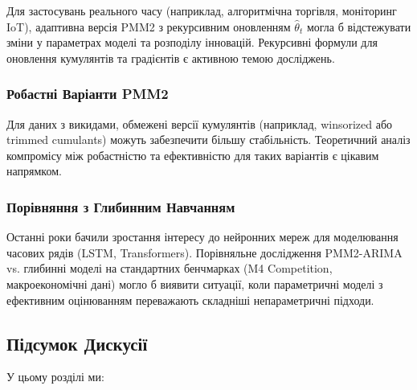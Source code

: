 \documentclass[12pt,a4paper]{article}
\begin{document}
Для застосувань реального часу (наприклад, алгоритмічна торгівля, моніторинг IoT), адаптивна версія PMM2 з рекурсивним оновленням $\hat{\theta}_t$ могла б відстежувати зміни у параметрах моделі та розподілу інновацій. Рекурсивні формули для оновлення кумулянтів та градієнтів є активною темою досліджень.

\subsubsection{Робастні Варіанти PMM2}

Для даних з викидами, обмежені версії кумулянтів (наприклад, winsorized або trimmed cumulants) можуть забезпечити більшу стабільність. Теоретичний аналіз компромісу між робастністю та ефективністю для таких варіантів є цікавим напрямком.

\subsubsection{Порівняння з Глибинним Навчанням}

Останні роки бачили зростання інтересу до нейронних мереж для моделювання часових рядів (LSTM, Transformers). Порівняльне дослідження PMM2-ARIMA vs. глибинні моделі на стандартних бенчмарках (M4 Competition, макроекономічні дані) могло б виявити ситуації, коли параметричні моделі з ефективним оцінюванням переважають складніші непараметричні підходи.

\subsection{Підсумок Дискусії}
\label{subsec:discussion_summary}

У цьому розділі ми:
\end{document}
